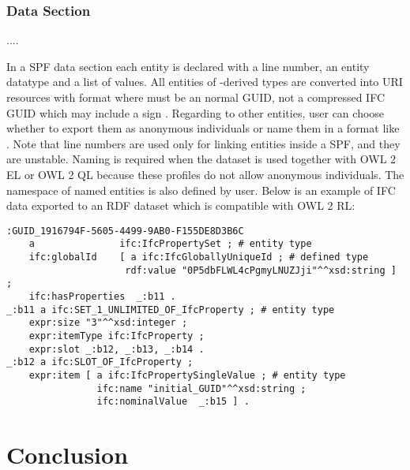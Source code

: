 \subsubsection{Data Section} ....

In a SPF data section each entity is declared with a line number, an entity data\-type and a list of values. All entities of -derived types are converted into URI resources with format  where  must be an normal GUID, not a compressed IFC GUID which may include a sign \name{\$}. Regarding to other entities, user can choose whether to export them as anonymous individuals or name them in a format like . Note that line numbers are used only for linking entities inside a SPF, and they are unstable. Naming is required when the dataset is used together with OWL 2 EL or OWL 2 QL because these profiles do not allow anonymous individuals. The namespace of named entities is also defined by user. Below is an example of IFC data exported to an RDF dataset which is compatible with OWL 2 RL:

\begin{lstlisting}
:GUID_1916794F-5605-4499-9AB0-F155DE8D3B6C
    a               ifc:IfcPropertySet ; # entity type
    ifc:globalId    [ a ifc:IfcGloballyUniqueId ; # defined type
                     rdf:value "0P5dbFLWL4cPgmyLNUZJji"^^xsd:string ] ;
    ifc:hasProperties  _:b11 .
_:b11 a ifc:SET_1_UNLIMITED_OF_IfcProperty ; # entity type
    expr:size "3"^^xsd:integer ;
    expr:itemType ifc:IfcProperty ;
    expr:slot _:b12, _:b13, _:b14 .
_:b12 a ifc:SLOT_OF_IfcProperty ;
    expr:item [ a ifc:IfcPropertySingleValue ; # entity type
                ifc:name "initial_GUID"^^xsd:string ;
                ifc:nominalValue  _:b15 ] .
\end{lstlisting}



\section{Conclusion}
\label{sec:conclusion}
